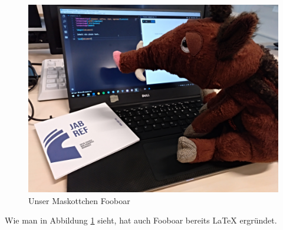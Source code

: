 \documentclass[a4paper, ngerman]{article}
\begin{document}
\thispagestyle{empty}
\begin{figure}[H]
  \includegraphics[width=\textwidth]{listings/references/fooboar.jpeg}
  \caption{Unser Maskottchen Fooboar}
  \label{img:fooboar}
\end{figure}

Wie man in Abbildung \ref{img:fooboar} sieht, hat auch Fooboar bereits \LaTeX{} ergründet.
\end{document}
